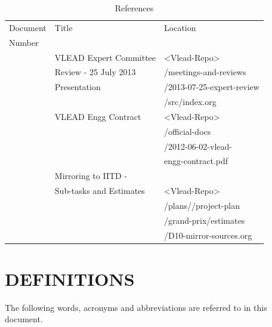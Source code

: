 \documentclass[11pt]{article}
\begin{document}
\begin{table}[H]
\caption{\label{tbl: References}References}
\begin{center}
\begin{tabular}{lll}
\hline
 Document  &  Title                    &  Location                   \\
 Number    &                           &                             \\
\hline
           &  VLEAD Expert Committee   &  <Vlead-Repo>               \\
           &  Review - 25 July 2013    &  /meetings-and-reviews      \\
           &  Presentation             &  /2013-07-25-expert-review  \\
           &                           &  /src/index.org             \\
           &  VLEAD Engg Contract      &  <Vlead-Repo>               \\
           &                           &  /official-docs             \\
           &                           &  /2012-06-02-vlead-         \\
           &                           &  engg-contract.pdf          \\
           &  Mirroring to IITD -      &                             \\
           &  Sub-tasks and Estimates  &  <Vlead-Repo>               \\
           &                           &  /plans//project-plan       \\
           &                           &  /grand-prix/estimates      \\
           &                           &  /D10-mirror-sources.org    \\
\hline
\end{tabular}
\end{center}
\end{table}


\section{DEFINITIONS}
\label{sec-13}

The following words, acronyms and abbreviations are referred to in
this document.
\end{document}
